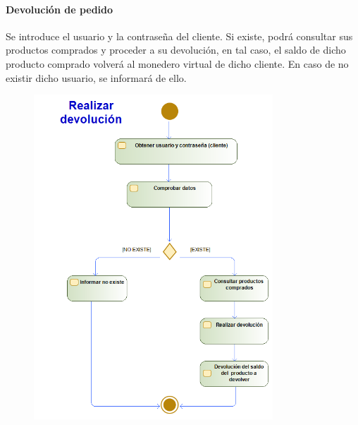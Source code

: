 \paragraph{Devolución de pedido}
Se introduce el usuario y la contraseña del cliente. Si existe, podrá consultar sus productos comprados y proceder a su devolución, en tal caso, el saldo de dicho producto comprado volverá al monedero virtual de dicho cliente. En caso de no existir dicho usuario, se informará de ello.
\begin{figure}[H]
    \centering
    \includegraphics[width=0.8\textwidth]{Use_Cases/realizar_devolucion.png}
\end{figure}
\newpage
